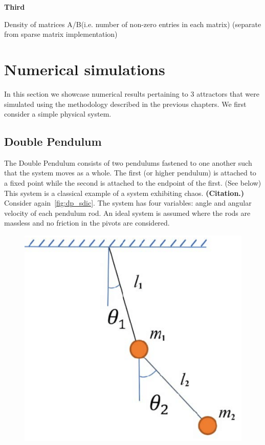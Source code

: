 \documentclass[a4paper,12pt,twoside]{report}
\begin{document}


\textbf{Third}

Density of matrices A/B(i.e. number of non-zero entries in each matrix) (separate from sparse matrix implementation)

\section{Numerical simulations}
In this section we showcase numerical results pertaining to 3 attractors that were simulated using the methodology described in the previous chapters. We first consider a simple physical system.
\subsection{Double Pendulum}

The Double Pendulum consists of two pendulums fastened to one another such that the system moves as a whole. The first (or higher pendulum) is attached to a fixed point while the second is attached to the endpoint of the first. (See below)
This system is a classical example of a system exhibiting chaos. \textbf{(Citation.)} Consider again~\ref{fig:dp_sdic}.
The system has four variables: angle and angular velocity of each pendulum rod. An ideal system is assumed where the rods are massless and no friction in the pivots are considered.

\begin{figure}[ht]
  \includegraphics[scale=0.35]{_dp_setup.eps}
  \centering
  \label{fig:dp_setup}
\end{figure}
\end{document}
